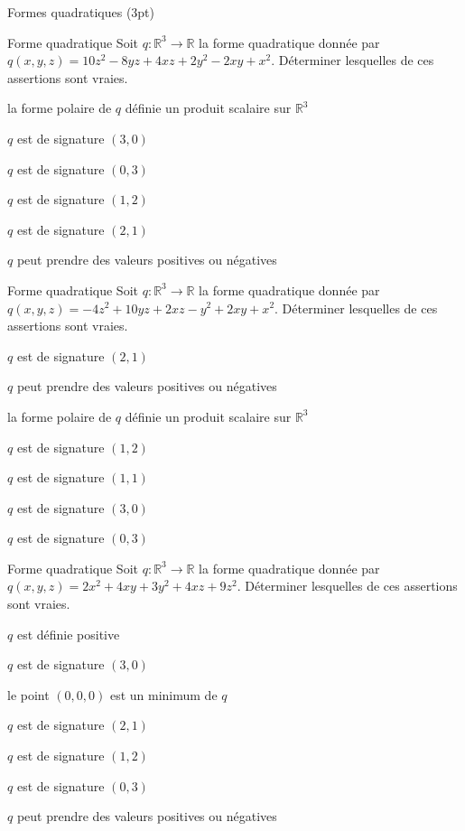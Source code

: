 \documentclass[12pt]{article}
\begin{document}
\begin{quiz}[points=3, multiple, shuffle, penalty=.5]
  {Formes quadratiques (3pt)}

  \begin{multi}{Forme quadratique}
    Soit $q:\mathbb{R}^3\to \mathbb{R}$ la forme quadratique donn\'{e}e par $q(x,y,z)= 10z^2-8yz+4xz+2y^2-2xy+x^2$. D\'{e}terminer lesquelles de ces assertions sont vraies.

  \item* la forme polaire de $q$ d\'{e}finie un produit scalaire sur $\mathbb R^3$
  \item* $q$ est de signature $(3,0)$
  \item $q$ est de signature $(0,3)$
  \item $q$ est de signature $(1,2)$
  \item $q$ est de signature $(2,1)$
  \item $q$ peut prendre des valeurs positives ou n\'{e}gatives
  \end{multi}

  \begin{multi}{Forme quadratique}
    Soit $q:\mathbb{R}^3\to \mathbb{R}$ la forme quadratique donn\'{e}e par $q(x,y,z)= -4z^2+10yz+2xz-y^2+2xy+x^2$. D\'{e}terminer lesquelles de ces assertions sont vraies.

  \item* $q$ est de signature $(2,1)$
  \item* $q$ peut prendre des valeurs positives ou n\'{e}gatives
  \item la forme polaire de $q$ d\'{e}finie un produit scalaire sur $\mathbb R^3$
  \item $q$ est de signature $(1,2)$
  \item $q$ est de signature $(1,1)$
  \item $q$ est de signature $(3,0)$
  \item $q$ est de signature $(0,3)$
  \end{multi}

  \begin{multi}{Forme quadratique}
    Soit $q:\mathbb{R}^3\to \mathbb{R}$ la forme quadratique donn\'{e}e par $q(x,y,z)=2x^2+4xy+3y^2+4xz+9z^2$. D\'{e}terminer lesquelles de ces assertions sont vraies.

  \item* $q$ est d\'{e}finie positive
  \item* $q$ est de signature $(3,0)$
  \item* le point $(0,0,0)$ est un minimum de $q$
  \item $q$ est de signature $(2,1)$
  \item $q$ est de signature $(1,2)$
  \item $q$ est de signature $(0,3)$
  \item $q$ peut prendre des valeurs positives ou n\'{e}gatives
  \end{multi}



\end{quiz}
\end{document}
